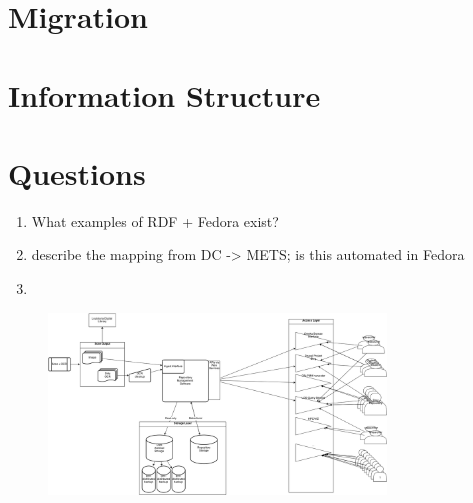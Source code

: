 \documentclass[oneside]{article}
\begin{document}
\section{Migration}


\section{Information Structure}


\section{Questions}
\begin{enumerate}
  \item{What examples of RDF + Fedora exist?}
  \item{describe the mapping from DC -> METS; is this automated in Fedora}
  \item{}
\end{enumerate}

\begin{figure}[H]
  \centering
  \includegraphics[width=0.8\textwidth]{apc-01.png}
\end{figure}


\end{document}
